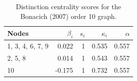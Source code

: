 \begin{table}
\centering
\caption{\label{tab:bonacich10}Distinction centrality scores for the Bonacich (2007) order 10 graph.}
\centering
\begin{tabular}[t]{lrrrr}
\toprule
Nodes & $\beta_i$ & $s_i$ & $\kappa_i$ & $\alpha$\\
\midrule
1, 3, 4, 6, 7, 9 & 0.022 & 1 & 0.535 & 0.557\\
2, 5, 8 & 0.014 & 1 & 0.543 & 0.557\\
10 & -0.175 & 1 & 0.732 & 0.557\\
\bottomrule
\end{tabular}
\end{table}
